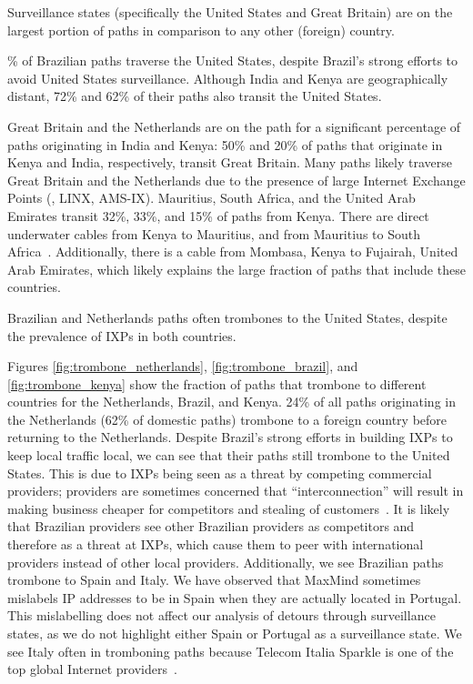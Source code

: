 \begin{finding}
Surveillance states (specifically the United States and Great Britain) are on the largest portion of paths in comparison to any other (foreign) country.
\end{finding}
\% of Brazilian paths traverse the United States, despite Brazil's
strong efforts to avoid United States surveillance.  Although India and
Kenya are geographically distant, 72\% and 62\% of their paths also transit
the United States.

Great Britain and the Netherlands are on the path for a significant
percentage of paths originating in India and Kenya: 50\% and 20\% of
paths that originate in Kenya and India, respectively, transit Great
Britain.   Many paths likely traverse Great Britain and the Netherlands due to
the presence of large Internet Exchange Points (\ie, LINX, AMS-IX).
Mauritius, South Africa, and the United Arab Emirates transit 32\%,
33\%, and 15\% of paths from Kenya.  There are direct underwater cables
from Kenya to Mauritius, and from Mauritius to South
Africa~\cite{cablemap}.  Additionally, there is a cable from Mombasa,
Kenya to Fujairah, United Arab Emirates, which likely explains the large
fraction of paths that include these countries. 



\begin{finding}
Brazilian and Netherlands paths often trombones to the United States, despite the prevalence of IXPs in both countries.
\end{finding}
\noindent
Figures \ref{fig:trombone_netherlands}, \ref{fig:trombone_brazil}, and \ref{fig:trombone_kenya} show the fraction of paths that trombone to different countries for the Netherlands, Brazil, and Kenya. 24\% of all paths originating in the Netherlands (62\% of domestic paths) trombone to a foreign country before returning to the Netherlands. Despite Brazil's strong efforts in building IXPs to keep local traffic local, we can see that their paths still trombone to the United States.  This is due to IXPs being seen as a threat by competing commercial providers; providers are sometimes concerned that ``interconnection'' will result in making business cheaper for competitors and stealing of customers~\cite{ixp_policy}.  It is likely that Brazilian providers see other Brazilian providers as competitors and therefore as a threat at IXPs, which cause them to peer with international providers instead of other local providers.  Additionally, we see Brazilian paths trombone to Spain and Italy. We have observed that MaxMind sometimes mislabels IP addresses to be in Spain when they are actually located in Portugal.  This mislabelling does not affect our analysis of detours through surveillance states, as we do not highlight either Spain or Portugal as a surveillance state.  We see Italy often in tromboning paths because Telecom Italia Sparkle is one of the top global Internet providers~\cite{bakers}.

